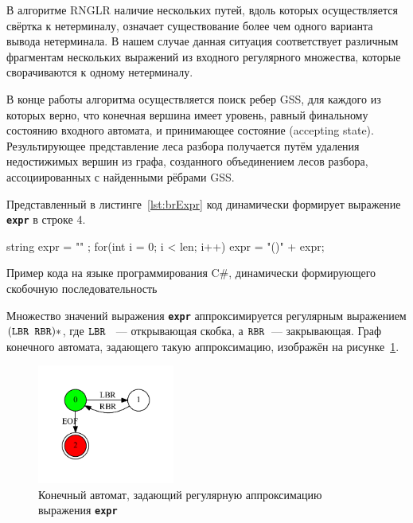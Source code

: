 В алгоритме RNGLR наличие нескольких путей, вдоль которых осуществляется свёртка к нетерминалу, означает существование более чем одного варианта вывода нетерминала. В нашем случае данная ситуация соответствует различным фрагментам нескольких выражений из входного регулярного множества, которые сворачиваются к одному нетерминалу. 

В конце работы алгоритма осуществляется поиск ребер GSS, для каждого из которых верно, что конечная вершина имеет уровень, равный финальному состоянию входного автомата, и принимающее состояние (accepting state). Результирующее представление леса разбора получается путём удаления недостижимых вершин из графа, созданного объединением лесов разбора, ассоциированных с найденными рёбрами GSS.

Представленный в листинге~\ref{lst:brExpr} код динамически формирует выражение \textbf{\texttt{expr}} в строке 4.

\begin{listing}
\begin{pyglist}[language=csharp,numbers=left,numbersep=5pt]
 string expr = "" ;
 for(int i = 0; i < len; i++) 
 {
     expr = "()" + expr;
 }
\end{pyglist}
\caption{Пример кода на языке программирования C\#, динамически формирующего скобочную последовательность}
\label{lst:brExpr}
\end{listing}

Множество значений выражения \textbf{\texttt{expr}} аппроксимируется регулярным выражением $(\mbox{\texttt{LBR }} \mbox{\texttt{RBR}})*$, где $\mbox{\texttt{LBR }}$ --- открывающая скобка, а $\mbox{\texttt{RBR}}$~--- закрывающая. Граф конечного автомата, задающего такую аппроксимацию, изображён на рисунке~\ref{input}.

\begin{figure}[!h]
 \centering
 \includegraphics[width=0.4\textwidth]{pics/input.pdf}
 \caption{Конечный автомат, задающий регулярную аппроксимацию выражения \textbf{\texttt{expr}}}
 \label{input}
\end{figure}

